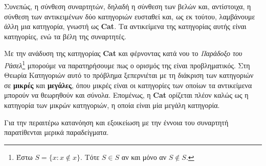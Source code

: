 \documentclass [a4paper,11pt] {book}
\theoremstyle{definition}
\theoremstyle{definition}
\newenvironment{remark}[1][Παρατήρηση]{\begin{trivlist}
\item[\hskip \labelsep {\bfseries #1}]}{\end{trivlist}}
\begin{document}
Συνεπώς, η σύνθεση συναρτητών, δηλαδή η σύνθεση των βελών και, αντίστοιχα, η σύνθεση των αντικειμένων δύο κατηγοριών ευσταθεί και, ως εκ τούτου, λαμβάνουμε άλλη μια κατηγορία, γνωστή ως \textbf{Cat}. Τα αντικείμενα της κατηγορίας αυτής είναι κατηγορίες, ενώ τα βέλη της συναρτητές.
\begin{remark}\label{foundationalQuestions}
Με την ανάδυση της κατηγορίας \textbf{Cat} και φέρνοντας κατά νου το \textit{Παράδοξο του Ράσελ}\footnote{Έστω $S=\{x : x \notin x \}$. Τότε $S \in S$ αν και μόνο αν $S \notin S$.} μπορούμε να παρατηρήσουμε πως ο ορισμός της είναι προβληματικός. Στη Θεωρία Κατηγοριών αυτό το πρόβλημα ξεπερνιέται με τη διάκριση των κατηγοριών σε \textbf{μικρές} και \textbf{μεγάλες}, όπου μικρές είναι οι κατηγορίες των οποίων τα αντικείμενα μπορούν να θεωρηθούν και σύνολα. Επομένως, η \textbf{Cat} ορίζεται πλέον καλώς ως η κατηγορία των μικρών κατηγοριών, η οποία είναι μία μεγάλη κατηγορία.
\end{remark}
Για την περαιτέρω κατανόηση και εξοικείωση με την έννοια του συναρτητή παρατίθενται μερικά παραδείγματα.
\end{document}
